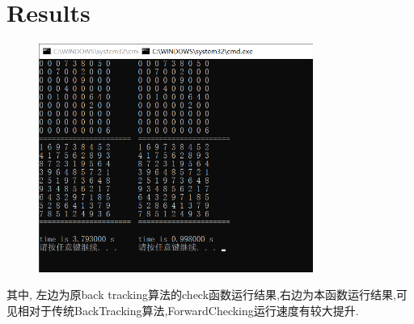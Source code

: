 \documentclass[UTF8]{ctexart}
\begin{document}
\section{Results}

\begin{figure}[!h]
    \centering
    \includegraphics[width=0.8\textwidth]{res.bmp}
\end{figure}

其中, 左边为原back tracking算法的check函数运行结果,右边为本函数运行结果,可见相对于传统BackTracking算法,ForwardChecking运行速度有较大提升.
%
%
\end{document}
